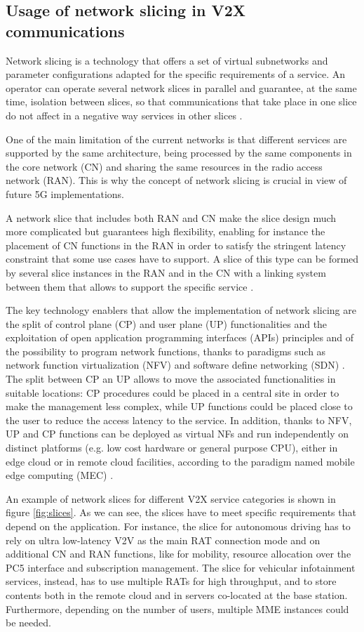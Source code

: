 \documentclass[conference,12pt,onecolumn]{IEEEtran}
\begin{document}
\subsection*{Usage of network slicing in V2X communications}
Network slicing is a technology that offers a set of virtual subnetworks and parameter configurations adapted for the specific requirements of a service. An operator can operate several network slices in parallel and guarantee, at the same time, isolation between slices, so that communications that take place in one slice do not affect in a negative way services in other slices \cite{3GPPTR22891}. 

One of the main limitation of the current networks is that different services are supported by the same architecture, being processed by the same components in the core network (CN) and sharing the same resources in the radio access network (RAN). This is why the concept of network slicing is crucial in view of future 5G implementations.

A network slice that includes both RAN and CN make the slice design much more complicated but guarantees high flexibility, enabling for instance the placement of CN functions in the RAN in order to satisfy the stringent latency constraint that some use cases have to support. A slice of this type can be formed by several slice instances in the RAN and in the CN with a linking system between them that allows to support the specific service \cite{3GPPTR23799}.

The key technology enablers that allow the implementation of network slicing are the split of control plane (CP) and user plane (UP) functionalities and the exploitation of open application programming interfaces (APIs) principles and of the possibility to program network functions, thanks to paradigms such as network function virtualization (NFV) \cite{ETSINFV} and software define networking (SDN) \cite{chen2015}. The split between CP an UP allows to move the associated functionalities in suitable locations: CP procedures could be placed in a central site in order to make the management less complex, while UP functions could be placed close to the user to reduce the access latency to the service. In addition, thanks to NFV, UP and CP functions can be deployed as virtual NFs and run independently on distinct platforms (e.g. low cost hardware or general purpose CPU), either in edge cloud or in remote cloud facilities, according to the paradigm named mobile edge computing (MEC) \cite{ETSIMEC}.

An example of network slices for different V2X service categories is shown in figure \ref{fig:slices}. As we can see, the slices have to meet specific requirements that depend on the application. For instance, the slice for autonomous driving has to rely on ultra low-latency V2V as the main RAT connection mode and on additional CN and RAN functions, like for mobility, resource allocation over the PC5 interface and subscription management.
The slice for vehicular infotainment services, instead, has to use multiple RATs for high throughput, and to store contents both in the remote cloud and in servers co-located at the base station. Furthermore, depending on the number of users, multiple MME instances could be needed.
\end{document}
